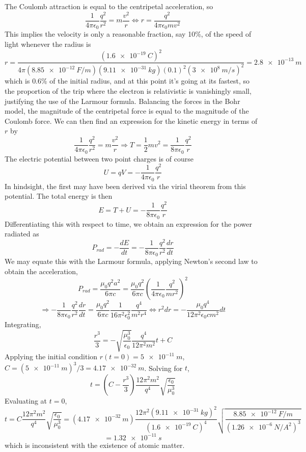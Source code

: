 \documentclass{article}
\begin{document}
\section{}
The Coulomb attraction is equal to the centripetal acceleration, so
\[\frac{1}{4\pi\epsilon_{0}}\frac{q^{2}}{r^{2}}=m\frac{v^{2}}{r}
  \Leftrightarrow r=\frac{q^{2}}{4\pi\epsilon_{0}mv^{2}}
\]
This implies the velocity is only a reasonable fraction, say 10\%, of the speed of light whenever the radius is
\[r=\frac{(\SI{1.6e-19}{C})^{2}}{4\pi(\SI{8.85e-12}{F/m})(\SI{9.11e-31}{kg})(0.1)^{2}(\SI{3e8}{m/s})^{2}}=\SI{2.8e-13}{m}\]
which is $0.6\%$ of the initial radius, and at this point it's going at its fastest, so the proportion of the trip where the
electron is relativistic is vanishingly small, justifying the use of the Larmour formula.
Balancing the forces in the Bohr model, the magnitude of the centripetal force is equal to the magnitude of the Coulomb force.
We can then find an expression for the kinetic energy in terms of $r$ by
\[
  \frac{1}{4\pi\epsilon_{0}}\frac{q^{2}}{r^{2}}=m\frac{v^{2}}{r}
  \Rightarrow T=\frac{1}{2}mv^{2}=\frac{1}{8\pi\epsilon_{0}}\frac{q^{2}}{r}
\]
The electric potential between two point charges is of course
\[U=qV=-\frac{1}{4\pi\epsilon_{0}}\frac{q^{2}}{r}\]
In hindsight, the first may have been derived via the virial theorem from this potential.
The total energy is then
\[E=T+U=-\frac{1}{8\pi\epsilon_{0}}\frac{q^{2}}{r}\]
Differentiating this with respect to time, we obtain an expression for the power radiated as
\[P_{rad}=-\frac{dE}{dt}=-\frac{1}{8\pi\epsilon_{0}}\frac{q^{2}}{r^{2}}\frac{dr}{dt}\]
We may equate this with the Larmour formula, applying Newton's second law to obtain the acceleration,
\[P_{rad}=\frac{\mu_{0}q^{2}a^{2}}{6\pi c}=\frac{\mu_{0}q^{2}}{6\pi c}\left( \frac{1}{4\pi\epsilon_{0}}\frac{q^{2}}{mr^{2}} \right)^{2}\]
\[
  \Rightarrow -\frac{1}{8\pi\epsilon_{0}}\frac{q^{2}}{r^{2}}\frac{dr}{dt}=\frac{\mu_{0}q^{2}}{6\pi c}\frac{1}{16\pi^{2}\epsilon_{0}^{2}}
  \frac{q^{4}}{m^{2}r^{4}}
  \Leftrightarrow r^{2}dr=-\frac{\mu_{0}q^{4}}{12\pi^{2}\epsilon_{0}cm^{2}}dt
\]
Integrating,
\[
  \frac{r^{3}}{3}=-\sqrt{\frac{\mu_{0}^{3}}{\epsilon_{0}}}\frac{q^{4}}{12\pi^{2}m^{2}}t+C
\]
Applying the initial condition $r(t=0)=\SI{5e-11}{m}$, $C=(\SI{5e-11}{m})^{3}/3=\SI{4.17e-32}{m}$.
Solving for $t$,
\[
  t=\left(C-\frac{r^{3}}{3} \right)\frac{12\pi^{2}m^{2}}{q^{4}}\sqrt{\frac{\epsilon_{0}}{\mu_{0}^{3}}}
\]
Evaluating at $t=0$,
\[
  t=C\frac{12\pi^{2} m^{2}}{q^{4}}\sqrt{\frac{\epsilon_{0}}{\mu_{0}^{3}}}
  =(\SI{4.17e-32}{m})\frac{12\pi^{2}(\SI{9.11e-31}{kg})^{2}}{(\SI{1.6e-19}{C})^{4}}\sqrt{\frac{\SI{8.85e-12}{F/m}}{(\SI{1.26e-6}{N/A^{2}})^{3}}}
\]
\[
  =\SI{1.32e-11}{s}
\]
which is inconsistent with the existence of atomic matter.
\end{document}
